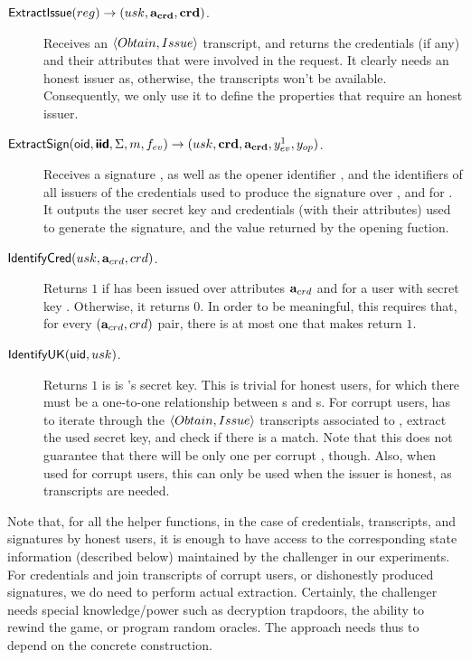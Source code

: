 \begin{description}
\item[$\mathsf{ExtractIssue}(reg) \rightarrow (usk,\mathbf{a}_{\mathbf{crd}},\mathbf{crd})$.]
  Receives an $\langle Obtain, Issue \rangle$ transcript, and returns the
  credentials (if any) and their attributes that were involved
  in the request. It clearly needs an honest issuer as, otherwise, the
  transcripts won't be available. Consequently, we only use it to define the
  properties that require an honest issuer.
\item[$\mathsf{ExtractSign}(\mathsf{oid},\boldsymbol{\mathsf{\mathsf{iid}}},\Sigma,m,f_{ev}) \rightarrow (usk,
  \mathbf{crd},\mathbf{a}_{\mathbf{crd}},y_{ev}^1,y_{op})$.] Receives a signature \Sig,
  as well as the opener identifier \oid, and the identifiers of all issuers of
  the credentials used to produce the signature over \msg, and for \feval. It
  outputs the user secret key and credentials (with their attributes) used to
  generate the signature, and the value returned by the opening fuction.
\item[$\mathsf{IdentifyCred}(usk,\mathbf{a}_{crd},crd)$.] Returns $1$ if \cred has been
  issued over attributes $\mathbf{a}_{crd}$ and for a user with secret key \usk.
  Otherwise, it returns $0$. In order to be meaningful, this requires that,
  for every $(\mathbf{a}_{crd},crd)$ pair, there is at most one \usk that makes
  \IdentifyCred return $1$.
\item[$\mathsf{IdentifyUK}(\mathsf{uid},usk)$.] Returns $1$ is \usk is {\uid}'s secret key.
  This is trivial for honest users, for which there must be a one-to-one
  relationship between {\uid}s and {\usk}s. For corrupt users, \IdentifyUK has
  to iterate through the $\langle Obtain,Issue\rangle$ transcripts associated
  to \uid, extract the used secret key, and check if there is a match. Note that
  this does not guarantee that there will be only one \usk per corrupt \uid,
  though. Also, when used for corrupt users, this can only be used when the
  issuer is honest, as transcripts are needed. 
\end{description}

Note that, for all the helper functions, in the case of credentials, transcripts,
and signatures by honest users, it is enough to have access to the corresponding
state information (described below) maintained by the challenger in our
experiments. For credentials and join transcripts of corrupt users, or
dishonestly produced signatures, we do need to perform actual extraction.
Certainly, the challenger
needs special knowledge/power such as decryption trapdoors, the ability to
rewind the game, or program random oracles. The approach needs thus to depend on
the concrete construction. 

